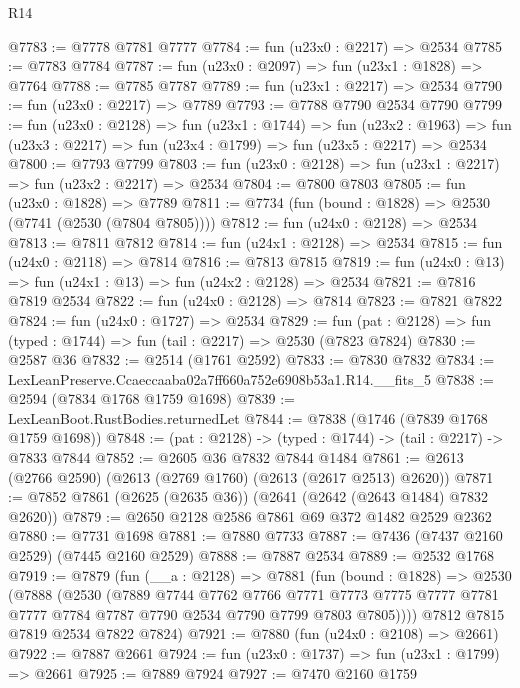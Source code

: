 \begin{lexlean}{R14}
\begin{coremodule}
@7783 := @7778 @7781 @7777
@7784 := fun (u23x0 : @2217) => @2534
@7785 := @7783 @7784
@7787 := fun (u23x0 : @2097) => fun (u23x1 : @1828) => @7764
@7788 := @7785 @7787
@7789 := fun (u23x1 : @2217) => @2534
@7790 := fun (u23x0 : @2217) => @7789
@7793 := @7788 @7790 @2534 @7790
@7799 := fun (u23x0 : @2128) =>
  fun (u23x1 : @1744) =>
  fun (u23x2 : @1963) => fun (u23x3 : @2217) => fun (u23x4 : @1799) => fun (u23x5 : @2217) => @2534
@7800 := @7793 @7799
@7803 := fun (u23x0 : @2128) => fun (u23x1 : @2217) => fun (u23x2 : @2217) => @2534
@7804 := @7800 @7803
@7805 := fun (u23x0 : @1828) => @7789
@7811 := @7734 (fun (bound : @1828) => @2530 (@7741 (@2530 (@7804 @7805))))
@7812 := fun (u24x0 : @2128) => @2534
@7813 := @7811 @7812
@7814 := fun (u24x1 : @2128) => @2534
@7815 := fun (u24x0 : @2118) => @7814
@7816 := @7813 @7815
@7819 := fun (u24x0 : @13) => fun (u24x1 : @13) => fun (u24x2 : @2128) => @2534
@7821 := @7816 @7819 @2534
@7822 := fun (u24x0 : @2128) => @7814
@7823 := @7821 @7822
@7824 := fun (u24x0 : @1727) => @2534
@7829 := fun (pat : @2128) => fun (typed : @1744) => fun (tail : @2217) => @2530 (@7823 @7824)
@7830 := @2587 @36
@7832 := @2514 (@1761 @2592)
@7833 := @7830 @7832
@7834 := LexLeanPreserve.Ccaeccaaba02a7ff660a752e6908b53a1.R14.__fits_5
@7838 := @2594 (@7834 @1768 @1759 @1698)
@7839 := LexLeanBoot.RustBodies.returnedLet
@7844 := @7838 (@1746 (@7839 @1768 @1759 @1698))
@7848 := (pat : @2128) -> (typed : @1744) -> (tail : @2217) -> @7833 @7844
@7852 := @2605 @36 @7832 @7844 @1484
@7861 := @2613 (@2766 @2590) (@2613 (@2769 @1760) (@2613 (@2617 @2513) @2620))
@7871 := @7852 @7861 (@2625 (@2635 @36)) (@2641 (@2642 (@2643 @1484) @7832 @2620))
@7879 := @2650 @2128 @2586 @7861 @69 @372 @1482 @2529 @2362
@7880 := @7731 @1698
@7881 := @7880 @7733
@7887 := @7436 (@7437 @2160 @2529) (@7445 @2160 @2529)
@7888 := @7887 @2534
@7889 := @2532 @1768
@7919 := @7879
    (fun (__a : @2128) =>
    @7881
      (fun (bound : @1828) =>
      @2530
        (@7888
          (@2530
            (@7889
              @7744
              @7762
              @7766
              @7771
              @7773
              @7775
              @7777
              @7781
              @7777
              @7784
              @7787
              @7790
              @2534
              @7790
              @7799
              @7803
              @7805))))
      @7812
      @7815
      @7819
      @2534
      @7822
      @7824)
@7921 := @7880 (fun (u24x0 : @2108) => @2661)
@7922 := @7887 @2661
@7924 := fun (u23x0 : @1737) => fun (u23x1 : @1799) => @2661
@7925 := @7889 @7924
@7927 := @7470 @2160 @1759

\end{coremodule}
\end{lexlean}
